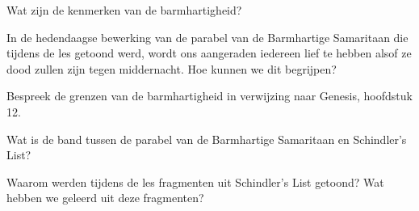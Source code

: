 \documentclass[main.tex]{subfiles}
\begin{document}
\begin{examenvraag}
    \begin{vraag}
        Wat zijn de kenmerken van de barmhartigheid?
    \end{vraag}

    \begin{antwoord}
    \end{antwoord}
\end{examenvraag}


\begin{examenvraag}
    \begin{vraag}
        In de hedendaagse bewerking van de parabel van de Barmhartige Samaritaan die tijdens de les getoond werd, wordt ons aangeraden iedereen lief te hebben alsof ze dood zullen zijn tegen middernacht. Hoe kunnen we dit begrijpen?
    \end{vraag}

    \begin{antwoord}
    \end{antwoord}
\end{examenvraag}


\begin{examenvraag}
    \begin{vraag}
        Bespreek de grenzen van de barmhartigheid in verwijzing naar Genesis, hoofdstuk 12.
    \end{vraag}

    \begin{antwoord}
    \end{antwoord}
\end{examenvraag}


\begin{examenvraag}
    \begin{vraag}
        Wat is de band tussen de parabel van de Barmhartige Samaritaan en Schindler’s List?
    \end{vraag}

    \begin{antwoord}
    \end{antwoord}
\end{examenvraag}


\begin{examenvraag}
    \begin{vraag}
        Waarom werden tijdens de les fragmenten uit Schindler’s List getoond? Wat hebben we geleerd uit deze fragmenten?
    \end{vraag}

    \begin{antwoord}
    \end{antwoord}
\end{examenvraag}
\end{document}
